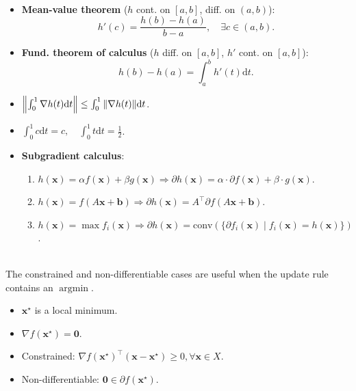 \documentclass[a4paper]{article}
\DeclareMathOperator*{\argmin}{argmin}
\newcommand{\lft}{\mathopen{}\mathclose\bgroup\left}
\newcommand{\rgt}{\aftergroup\egroup\right}
\renewcommand{\vec}[1]{\mathbf{#1}}
\newcommand{\mat}[1]{#1}
\newcommand{\transpose}[1]{#1^\top}
\newenvironment{topic}[1]
{\textbf{\sffamily \colorbox{black}{\rlap{\textbf{\textcolor{white}{#1}}}\hspace{\linewidth}\hspace{-2\fboxsep}}} \\ \vspace{0.2cm}}
{}
\begin{document}
\begin{multicols*}{2}
\begin{topic}{Lemmas}
\begin{itemize}
            \item \textbf{Mean-value theorem} ($h$ cont. on $[a,b]$, diff. on $(a,b)$): \[
                      h'(c) = \frac{h(b) - h(a)}{b-a}, \quad \exists c \in (a,b).
                  \]
            \item \textbf{Fund. theorem of calculus} ($h$ diff. on $[a,b]$, $h'$ cont. on $[a,b]$): \[
                      h(b) - h(a) = \int_a^b h'(t) \mathrm{d}t.
                  \]
            \item $\lft\| \int_0^1 \nabla h(t) \mathrm{d}t \rgt\| \leq \int_0^1 \| \nabla h(t) \| \mathrm{d}t$.
            \item $\int_0^1 c \mathrm{d}t = c, \quad \int_0^1 t \mathrm{d}t = \frac{1}{2}$.
            \item \textbf{Subgradient calculus}:
                  \begin{enumerate}
                      \item $h(\vec{x}) = \alpha f(\vec{x}) + \beta g(\vec{x}) \Rightarrow \partial h(\vec{x}) = \alpha \cdot \partial f(\vec{x}) + \beta \cdot g(\vec{x})$.
                      \item $h(\vec{x}) = f(\mat{A} \vec{x} + \vec{b}) \Rightarrow \partial h(\vec{x}) = \transpose{\mat{A}} \partial f(\mat{A} \vec{x} + \vec{b})$.
                      \item $h(\vec{x}) = \max f_i(\vec{x}) \Rightarrow \partial h(\vec{x}) = \mathrm{conv}(\{ \partial f_i(\vec{x}) \mid f_i(\vec{x}) = h(\vec{x}) \})$.
                  \end{enumerate}
        \end{itemize}
    \end{topic}

    \begin{topic}{Optimality lemmas (assume convexity)}
        The constrained and non-differentiable cases are useful when the update rule contains an $\argmin$.
        \begin{itemize}
            \item $\vec{x}^\star$ is a local minimum.
            \item $\nabla f(\vec{x}^\star) = \vec{0}$.
            \item Constrained: $\nabla f(\vec{x}^\star)^\top (\vec{x} - \vec{x}^\star) \geq 0, \forall \vec{x} \in
                      X$.
            \item Non-differentiable: $\vec{0} \in \partial f(\vec{x}^\star)$.
        \end{itemize}
    \end{topic}


\end{multicols*}
\end{document}
